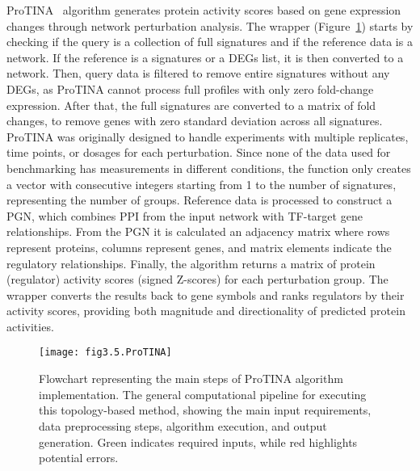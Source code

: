 \gls{ProTINA}~\cite{RN80} algorithm generates protein activity scores based on gene expression changes through network perturbation analysis. The wrapper (Figure~\ref{fig:fig3.5.ProTINA}) starts by checking if the query is a collection of full signatures and if the reference data is a network. If the reference is a signatures or a \gls{DEGs} list, it is then converted to a network. Then, query data is filtered to remove entire signatures without any \gls{DEGs}, as ProTINA cannot process full profiles with only zero fold-change expression. After that, the full signatures are converted to a matrix of fold changes, to remove genes with zero standard deviation across all signatures. \gls{ProTINA} was originally designed to handle experiments with multiple replicates, time points, or dosages for each perturbation. Since none of the data used for benchmarking has measurements in different conditions, the function only creates a vector with consecutive integers starting from 1 to the number of signatures, representing the number of groups. Reference data is processed to construct a PGN, which combines PPI from the input network with TF-target gene relationships. From the PGN it is calculated an adjacency matrix where rows represent proteins, columns represent genes, and matrix elements indicate the regulatory relationships. Finally, the algorithm returns a matrix of protein (regulator) activity scores (signed Z-scores) for each perturbation group. The wrapper converts the results back to gene symbols and ranks regulators by their activity scores, providing both magnitude and directionality of predicted protein activities.

\begin{figure}[htbp]
    \centering
    \texttt{[image: fig3.5.ProTINA]}
    \caption[Flowchart representing the main steps of ProTINA algorithm implementation.]{Flowchart representing the main steps of \gls{ProTINA} algorithm implementation. The general computational pipeline for executing this topology-based method, showing the main input requirements, data preprocessing steps, algorithm execution, and output generation. Green indicates required inputs, while red highlights potential errors.}
    \label{fig:fig3.5.ProTINA}
\end{figure}


